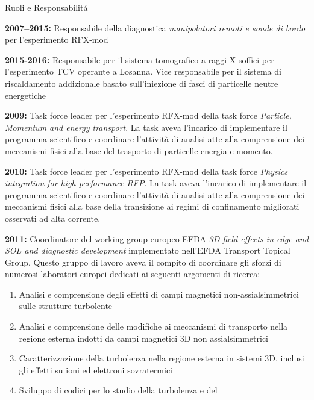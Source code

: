 \begin{statementblock}{Ruoli e Responsabilit{\'a}}
\end{statementblock}
\begin{enumerate}[label={[E\arabic*]}]

\item \textbf{2007--2015:} Responsabile della diagnostica
  \emph{manipolatori remoti e sonde di bordo} per l'esperimento
  RFX-mod
%
\item \textbf{2015-2016:} Responsabile per il sistema tomografico a
  raggi X soffici per l'esperimento TCV operante a Losanna. Vice
  responsabile per il sistema di riscaldamento addizionale basato
  sull'iniezione di fasci di particelle neutre energetiche
%
\item \textbf{2009:} Task force leader per l'esperimento RFX-mod della
  task force \emph{Particle, Momentum and energy transport}. La task
  aveva l'incarico di implementare il programma scientifico e
  coordinare l'attivit{\`a} di analisi atte alla comprensione dei
  meccanismi fisici alla base del trasporto di particelle energia e
  momento.
%
\item \textbf{2010:} Task force leader per l'esperimento RFX-mod della
  task force \emph{Physics integration for high performance RFP}. La
  task aveva l'incarico di implementare il programma scientifico e
  coordinare l'attivit{\`a} di analisi atte alla comprensione dei
  meccanismi fisici alla base della transizione ai regimi di
  confinamento migliorati osservati ad alta corrente.
%
\item \textbf{2011:} Coordinatore del working group europeo EFDA
  \emph{3D field effects in edge and SOL and diagnostic development}
  implementato nell'EFDA Transport Topical Group. Questo gruppo di
  lavoro aveva il compito di coordinare gli sforzi di numerosi
  laboratori europei dedicati ai seguenti argomenti di ricerca:
  \begin{enumerate}[noitemsep,leftmargin=*,topsep=0pt,partopsep=0pt]
  \item Analisi e comprensione degli effetti di campi magnetici
    non-assialsimmetrici sulle strutture turbolente
  \item Analisi e comprensione delle modifiche ai meccanismi di
    transporto nella regione esterna indotti da campi magnetici 3D non
    assialsimmetrici
  \item Caratterizzazione della turbolenza nella regione esterna in
    sistemi 3D, inclusi gli effetti su ioni ed elettroni sovratermici
  \item Sviluppo di codici per lo studio della turbolenza e del

\end{enumerate}
\end{enumerate}
